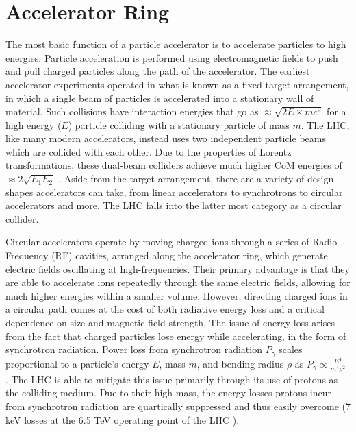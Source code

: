 \section{Accelerator Ring}
    The most basic function of a particle accelerator is to accelerate particles to high energies.
    Particle acceleration is performed using electromagnetic fields to push and pull charged particles along the path of the accelerator.
    The earliest accelerator experiments operated in what is known as a fixed-target arrangement, in which a single beam of particles is accelerated into a stationary wall of material.
    Such collisions have interaction energies that go as $\approx \sqrt{2 E \times m c^2}$ for a high energy ($E$) particle colliding with a stationary particle of mass $m$.
    The LHC, like many modern accelerators, instead uses two independent particle beams which are collided with each other.
    Due to the properties of Lorentz transformations, these dual-beam colliders achieve much higher CoM energies of $\approx 2 \sqrt{E_1 E_2}$ \cite{modern_and_future_colliders}.
    Aside from the target arrangement, there are a variety of design shapes accelerators can take, from linear accelerators to synchrotrons to circular accelerators and more.
    The LHC falls into the latter most category as a circular collider.

    Circular accelerators operate by moving charged ions through a series of Radio Frequency (RF) cavities, arranged along the accelerator ring, which generate electric fields oscillating at high-frequencies.
    Their primary advantage is that they are able to accelerate ions repeatedly through the same electric fields, allowing for much higher energies within a smaller volume.
    However, directing charged ions in a circular path comes at the cost of both radiative energy loss and a critical dependence on size and magnetic field strength.
    The issue of energy loss arises from the fact that charged particles lose energy while accelerating, in the form of synchrotron radiation.
    Power loss from synchrotron radiation $P_\gamma$ scales proportional to a particle's energy $E$, mass $m$, and bending radius $\rho$ as $P_\gamma \propto \frac{E^4}{m^4 \rho^2}$ \cite{2007_Book_ParticleAcceleratorPhysics}.
    The LHC is able to mitigate this issue primarily through its use of protons as the colliding medium.
    Due to their high mass, the energy losses protons incur from synchrotron radiation are quartically suppressed and thus easily overcome (7 keV losses at the 6.5 TeV operating point of the LHC \cite{lhc_machine}). %

